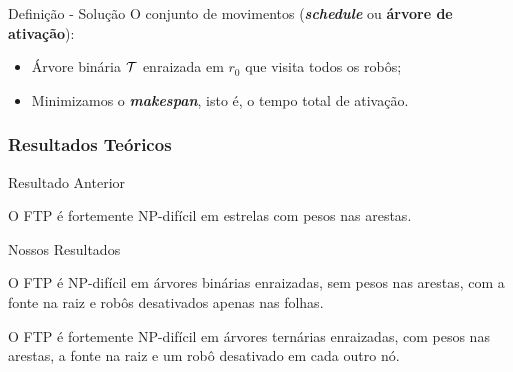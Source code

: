 \stopcounter
\begin{frame}{Definição - Solução}
  O conjunto de movimentos (\textbf{\emph{schedule}} ou \textbf{árvore de ativação}):

  \pause

  \begin{itemize}[<+->]
    \item Árvore binária $\mathcal{T}$ enraizada em $r_0$ que visita todos os robôs;

    \item Minimizamos o \textbf{\emph{makespan}}, isto é, o tempo total de ativação.
  \end{itemize}

  \pause
  \bigskip
  \begin{minipage}{\linewidth}
    \centering
  \end{minipage}
\end{frame}
\inccounter


\subsubsection{Resultados Teóricos}

\begin{frame}{Resultado Anterior}
  \begin{thm}
    O FTP é fortemente NP-difícil em estrelas com pesos nas arestas.
  \end{thm}
\end{frame}

\begin{frame}{Nossos Resultados}
  \begin{cor}
    O FTP é NP-difícil em árvores binárias enraizadas, sem pesos nas arestas, com a fonte na raiz e robôs desativados apenas nas folhas.
  \end{cor}

  \pause
  \begin{cor}
    O FTP é fortemente NP-difícil em árvores ternárias enraizadas, com pesos nas arestas, a fonte na raiz e um robô desativado em cada outro nó.
  \end{cor}
\end{frame}

